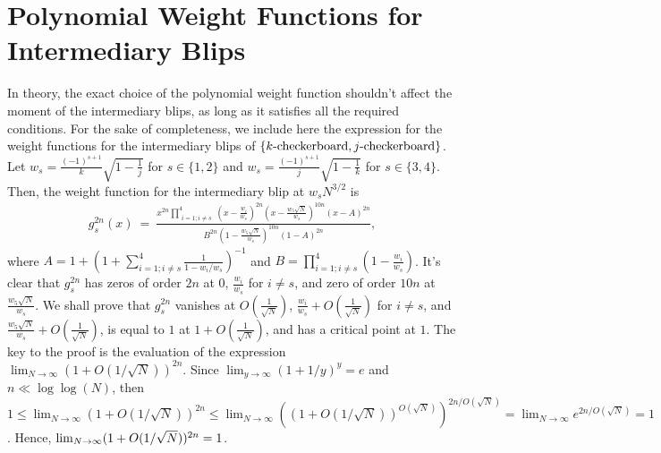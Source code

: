 \documentclass[11pt,reqno]{amsart}
\numberwithin{equation}{section}
\theoremstyle{plain}
\begin{document}
\section{Polynomial Weight Functions for Intermediary Blips}\label{intermediaryblip}
In theory, the exact choice of the polynomial weight function shouldn't affect the moment of the intermediary blips, as long as it satisfies all the required conditions. For the sake of completeness, we include here the expression for the weight functions for the intermediary blips of $\{k\textup{-checkerboard}, j\textup{-checkerboard}\}$. Let $w_s=\frac{(-1)^{s+1}}{k}\sqrt{1-\frac{1}{j}}$ for $s\in \{1, 2\}$ and $w_s=\frac{(-1)^{s+1}}{j}\sqrt{1-\frac{1}{k}}$ for $s\in \{3, 4\}$. Then, the weight function for the intermediary blip at $w_sN^{3/2}$ is
\begin{align}
g_s^{2n}(x) \ = \ \frac{x^{2n}\prod_{\substack{i=1; i\neq s}}^4\left(x-\frac{w_i}{w_s}\right)^{2n}\left(x-\frac{w_5\sqrt{N}}{w_s}\right)^{10n}(x-A)^{2n}}{B^{2n}\left(1-\frac{w_5 \sqrt{N}}{w_s}\right)^{10n}(1-A)^{2n}},
\end{align}
where $A=1+\left(1+\sum_{i=1;i\neq s}^4 \frac{1}{1-w_i/w_s}\right)^{-1}$ and $B=\prod_{i=1;i\neq s}^4\left(1-\frac{w_i}{w_s}\right)$. It's clear that $g_s^{2n}$ has zeros of order $2n$ at $0$, $\frac{w_i}{w_s}$ for $i\neq s$, and zero of order $10n$ at $\frac{w_5\sqrt{N}}{w_s}$. We shall prove that $g_s^{2n}$ vanishes at $O\left(\frac{1}{\sqrt{N}}\right)$, $\frac{w_i}{w_s}+O\left(\frac{1}{\sqrt{N}}\right)$ for $i\neq s$, and $\frac{w_5\sqrt{N}}{w_s}+O\left(\frac{1}{\sqrt{N}}\right)$, is equal to $1$ at $1+O\left(\frac{1}{\sqrt{N}}\right)$, and has a critical point at $1$. The key to the proof is the evaluation of the expression $\lim_{N\rightarrow\infty}(1+O(1/\sqrt{N}))^{2n}$. Since $\lim_{y\rightarrow \infty}(1+1/y)^y=e$ and $n\ll \log\log(N)$, then $1\leq\lim_{N\rightarrow\infty}(1+O(1/\sqrt{N}))^{2n}\leq\lim_{N\rightarrow\infty}\left((1+O(1/\sqrt{N}))^{O(\sqrt{N})}\right)^{2n/O(\sqrt{N})}=\lim_{N\rightarrow\infty} e^{2n/O(\sqrt{N})}=1$. Hence, $\lim_{N\rightarrow\infty}(1+O(1/\sqrt{N}))^{2n}\\=1$.
\end{document}
